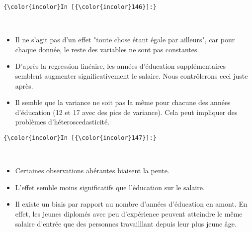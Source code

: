 \documentclass[11pt]{article}
\providecommand{\tightlist}{%
      \setlength{\itemsep}{0pt}\setlength{\parskip}{0pt}}
\begin{document}
    \begin{Verbatim}[commandchars=\\\{\}]
{\color{incolor}In [{\color{incolor}146}]:} 
\end{Verbatim}


    \begin{center}
    \end{center}
    { \hspace*{\fill} \\}
    
    \begin{itemize}
\tightlist
\item
  Il ne s'agit pas d'un effet "toute chose étant égale par ailleurs",
  car pour chaque donnée, le reste des variables ne sont pas constantes.
\item
  D'après la regression linéaire, les années d'éducation supplémentaires
  semblent augmenter significativement le salaire. Nous contrôlerons
  ceci juste après.
\item
  Il semble que la variance ne soit pas la même pour chacune des années
  d'éducation (12 et 17 avec des pics de variance). Cela peut impliquer
  des problèmes d'héteroscedasticité.
\end{itemize}

    \begin{Verbatim}[commandchars=\\\{\}]
{\color{incolor}In [{\color{incolor}147}]:} 
\end{Verbatim}


    \begin{center}
    \end{center}
    { \hspace*{\fill} \\}
    
    \begin{itemize}
\tightlist
\item
  Certaines observations abérantes biaisent la pente.
\item
  L'effet semble moins significatifs que l'éducation sur le salaire.
\item
  Il existe un biais par rapport au nombre d'années d'éducation en
  amont. En effet, les jeunes diplomés avec peu d'expérience peuvent
  atteindre le même salaire d'entrée que des personnes travailllant
  depuis leur plus jeune âge.
\end{itemize}
\end{document}
